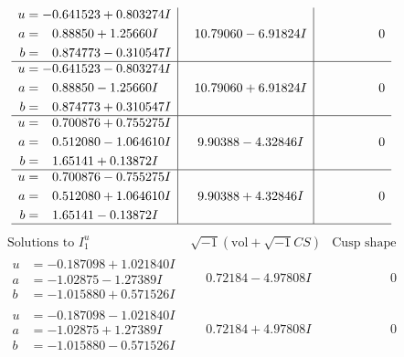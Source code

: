 \documentclass[1p]{elsarticle_modified}
\theoremstyle{definition}
\newcommand{\I}{\sqrt{-1}}
\begin{document}
$$\begin{array}{c|c|c}
\begin{aligned}
u &= -0.641523 + 0.803274 I \\
a &= \phantom{-}0.88850 + 1.25660 I \\
b &= \phantom{-}0.874773 - 0.310547 I\end{aligned}
 & \phantom{-}10.79060 - 6.91824 I & \phantom{-0.000000 } 0 \\ \hline\begin{aligned}
u &= -0.641523 - 0.803274 I \\
a &= \phantom{-}0.88850 - 1.25660 I \\
b &= \phantom{-}0.874773 + 0.310547 I\end{aligned}
 & \phantom{-}10.79060 + 6.91824 I & \phantom{-0.000000 } 0 \\ \hline\begin{aligned}
u &= \phantom{-}0.700876 + 0.755275 I \\
a &= \phantom{-}0.512080 - 1.064610 I \\
b &= \phantom{-}1.65141 + 0.13872 I\end{aligned}
 & \phantom{-}9.90388 - 4.32846 I & \phantom{-0.000000 } 0 \\ \hline\begin{aligned}
u &= \phantom{-}0.700876 - 0.755275 I \\
a &= \phantom{-}0.512080 + 1.064610 I \\
b &= \phantom{-}1.65141 - 0.13872 I\end{aligned}
 & \phantom{-}9.90388 + 4.32846 I & \phantom{-0.000000 } 0\\
 \hline 
 \end{array}$$\newpage$$\begin{array}{c|c|c}  
\text{Solutions to }I^u_{1}& \I (\text{vol} + \sqrt{-1}CS) & \text{Cusp shape}\\
 \hline 
\begin{aligned}
u &= -0.187098 + 1.021840 I \\
a &= -1.02875 - 1.27389 I \\
b &= -1.015880 + 0.571526 I\end{aligned}
 & \phantom{-}0.72184 - 4.97808 I & \phantom{-0.000000 } 0 \\ \hline\begin{aligned}
u &= -0.187098 - 1.021840 I \\
a &= -1.02875 + 1.27389 I \\
b &= -1.015880 - 0.571526 I\end{aligned}
 & \phantom{-}0.72184 + 4.97808 I & \phantom{-0.000000 } 0 \\ \hline\begin{aligned}

\end{aligned}
\end{array}$$
\end{document}
